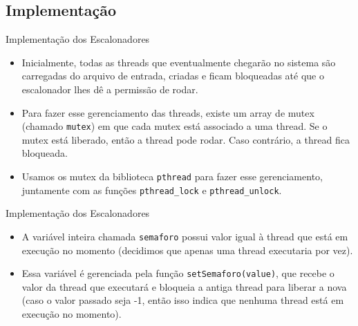 \documentclass[10pt]{beamer}
\begin{document}
    \subsection{Implementação}
    \begin{frame}{Implementação dos Escalonadores}
        \begin{itemize}
            \justifying
            \item Inicialmente, todas as threads que eventualmente chegarão no sistema são carregadas do arquivo de entrada, criadas e ficam bloqueadas até que o escalonador lhes dê a permissão de rodar.

            \item Para fazer esse gerenciamento das threads, existe um array de mutex (chamado \texttt{mutex}) em
        que cada mutex está associado a uma thread. Se o mutex está liberado, então a thread pode
        rodar. Caso contrário, a thread fica bloqueada.

            \item Usamos os mutex da biblioteca
        \texttt{pthread} para fazer esse gerenciamento, juntamente com as funções \texttt{pthread\_lock} e \texttt{pthread\_unlock}.
        \end{itemize}
    \end{frame}
    \begin{frame}{Implementação dos Escalonadores}
        \begin{itemize}
            \justifying
            \item A variável inteira chamada \texttt{semaforo} possui valor igual à thread que está em execução no momento (decidimos que apenas uma thread executaria por vez).

            \item Essa variável é gerenciada pela função \texttt{setSemaforo(value)},
        que recebe o valor da thread que executará e bloqueia a antiga
        thread para liberar a nova (caso o valor passado seja -1,
        então isso indica que nenhuma thread está em execução no momento).
        \end{itemize}
    \end{frame}
\end{document}
